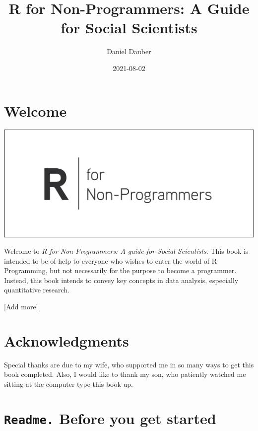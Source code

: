 \documentclass[
]{book}
\title{R for Non-Programmers: A Guide for Social Scientists}
\author{Daniel Dauber}
\date{2021-08-02}
\begin{document}
\maketitle

{
\setcounter{tocdepth}{1}
\tableofcontents
}
\hypertarget{welcome}{%
\chapter*{Welcome 👋}\label{welcome}}

\includegraphics{images/chapter_00_img/r_for_non_programmers_logo.png}

Welcome to \emph{R for Non-Programmers: A guide for Social Scientists}. This book is intended to be of help to everyone who wishes to enter the world of R Programming, but not necessarily for the purpose to become a programmer. Instead, this book intends to convey key concepts in data analysis, especially quantitative research.

{[}Add more{]}

\hypertarget{acknowledgments}{%
\chapter*{Acknowledgments 🙏}\label{acknowledgments}}

Special thanks are due to my wife, who supported me in so many ways to get this book completed. Also, I would like to thank my son, who patiently watched me sitting at the computer type this book up.

\hypertarget{readme-before-you-get-started}{%
\chapter{\texorpdfstring{\texttt{Readme.} Before you get started}{Readme. Before you get started}}\label{readme-before-you-get-started}}
\end{document}
